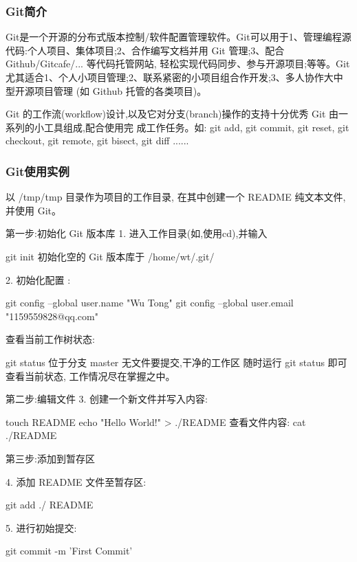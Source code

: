 \subsubsection{Git简介} 

Git是一个开源的分布式版本控制/软件配置管理软件。Git可以用于1、管理编程源代码:个人项目、集体项目;2、合作编写文档并用 Git 管理;3、配合 Github/Gitcafe/... 等代码托管网站, 轻松实现代码同步、参与开源项目;等等。Git尤其适合1、个人小项目管理;2、联系紧密的小项目组合作开发;3、多人协作大中型开源项目管理 (如 Github 托管的各类项目)。

Git 的工作流(workflow)设计,以及它对分支(branch)操作的支持十分优秀
Git 由一系列的小工具组成,配合使用完 成工作任务。如: git add, git commit, git reset, git checkout, git remote, git bisect, git diff ......


\subsubsection{Git使用实例}
以 /tmp/tmp 目录作为项目的工作目录, 在其中创建一个 README 纯文本文件, 并使用 Git。

第一步:初始化 Git 版本库
1. 进入工作目录(如,使用cd),并输入
\begin{Code}
	git init
	初始化空的 Git 版本库于 /home/wt/.git/
\end{Code}
2. 初始化配置 :
\begin{Code}
	git config --global user.name "Wu Tong"
	git config --global user.email "1159559828@qq.com"
\end{Code}
查看当前工作树状态:
\begin{Code}
	git status
	位于分支 master
	无文件要提交,干净的工作区
	随时运行 git status 即可查看当前状态, 工作情况尽在掌握之中。
\end{Code}

第二步:编辑文件
3. 创建一个新文件并写入内容:
\begin{Code}
	touch README
	echo "Hello World!" > ./README
	查看文件内容:
	cat ./README
\end{Code}

第三步:添加到暂存区

4. 添加 README 文件至暂存区:
\begin{Code}
	git add ./ README
\end{Code}


5. 进行初始提交:
\begin{Code}
	git commit -m 'First Commit'
\end{Code}




